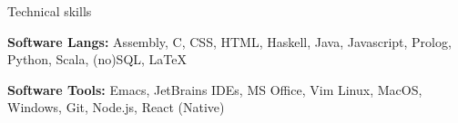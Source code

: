 \documentclass[10pt]{resume} %
\begin{document}
\begin{rSection}{Technical skills}
    \item \textbf{Software Langs:}
        Assembly,
        C,
        CSS,
        HTML,
        Haskell,
        Java,
        Javascript,
        Prolog,
        Python,
        Scala,
        (no)SQL,
        \LaTeX
    \item \textbf{Software Tools:}
        Emacs,
        JetBrains IDEs,
        MS Office,
        Vim
        Linux,
        MacOS,
        Windows,
        Git,
        Node.js,
        React (Native)
\end{rSection}

\end{document}
